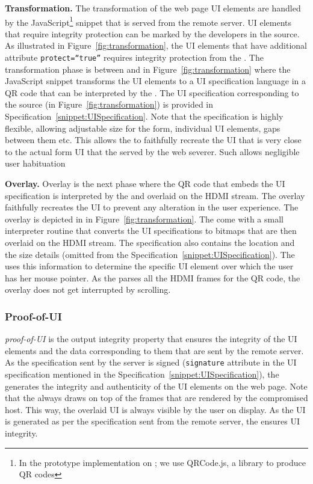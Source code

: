 \begin{mylist}
\item \textbf{Transformation.} The transformation of the web page UI elements are handled by the \name JavaScript\footnote{In the prototype implementation on \name; we use QRCode.js, a \js library to produce QR codes} snippet that is served from the remote server. UI elements that require integrity protection can be marked by the developers in the \html source. As illustrated in Figure~\ref{fig:transformation}, the \html UI elements that have additional attribute \texttt{protect=``true''} requires integrity protection from the \device. The transformation phase is between \one and \two in Figure~\ref{fig:transformation} where the \name JavaScript snippet transforms the UI elements to a UI specification language in a QR code that can be interpreted by the \device. The UI specification corresponding to the \html source (in Figure~\ref{fig:transformation}) is provided in Specification~\ref{snippet:UISpecification}. Note that the specification is highly flexible, allowing adjustable size for the form, individual UI elements, gaps between them etc. This allows the \device to faithfully recreate the UI that is very close to the actual form UI that the served by the web severer. Such allows negligible user habituation

\item \textbf{Overlay.} Overlay is the next phase where the QR code that embeds the UI specification is interpreted by the \device and overlaid on the HDMI stream. The overlay faithfully recreates the UI to prevent any alteration in the user experience. The \device overlay is depicted in \three in Figure~\ref{fig:transformation}. The \device come with a small interpreter routine that converts the UI specifications to bitmaps that are then overlaid on the HDMI stream. The specification also contains the location and the size details (omitted from the Specification~\ref{snippet:UISpecification}). The \device uses this information to determine the specific UI element over which the user has her mouse pointer. As the \device parses all the HDMI frames for the QR code, the overlay does not get interrupted by scrolling.
\end{mylist}

\subsubsection{Proof-of-UI} \emph{proof-of-UI} is the output integrity property that ensures the integrity of the UI elements and the data corresponding to them that are sent by the remote server. As the specification sent by the server is signed (\texttt{signature} attribute in the UI specification mentioned in the Specification~\ref{snippet:UISpecification}), the \device generates the integrity and authenticity of the UI elements on the web page. Note that the \device always draws on top of the frames that are rendered by the compromised host. This way, the overlaid UI is always visible by the user on display. As the UI is generated as per the specification sent from the remote server, the \device ensures UI integrity.

